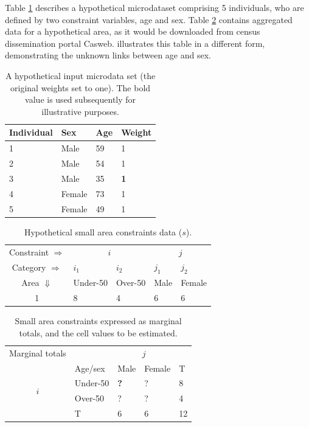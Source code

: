 \documentclass[a4paper,10pt]{article}
\begin{document}
Table \ref{t:w}  describes a
hypothetical microdataset comprising 5 individuals, who are defined by two
constraint variables, age and sex. 
Table \ref{t:s} contains aggregated data
for a hypothetical area, as it would be downloaded from census dissemination
portal Casweb.  illustrates this table in a different form,
demonstrating the unknown links between age and sex.

\begin{table}[h]
\centering
\caption[A hypothetical input microdata set]{A
hypothetical input microdata set (the original
weights set to one). The bold value is used subsequently for
illustrative purposes.}
\begin{tabular}{llll}
\toprule
{Individual } & {Sex} & {Age} & {Weight} \\
\midrule
1 & Male & 59 & 1 \\
2 & Male & 54 & 1 \\
3 & {Male} & {35} & \textbf{1} \\
4 & Female & 73 & 1 \\
5 & Female & 49 & 1 \\
\bottomrule
\end{tabular}
\label{t:w}
\end{table}
\vspace{1cm}


\begin{table}[htbp]
\centering
\caption{Hypothetical small area constraints data ($s$).}
\begin{tabular}{cllll}
\toprule
Constraint $\Rightarrow$ & \multicolumn{2}{c}{$i$}& \multicolumn{2}{c}{$j$}\\
Category $\Rightarrow$ & $i_1$ & $i_2$ & $j_1$ & $j_2$ \\
Area $\Downarrow$  & Under-50 & Over-50 &  Male & Female\\
1  & 8 & 4 & 6 & 6\\
\bottomrule
\end{tabular}
\label{t:s}
\end{table}
\vspace{1cm}

\begin{table}[htbp]
\centering
\caption[Small area constraints expressed as marginal totals]{Small
area constraints expressed as marginal totals, and the cell
values to be estimated.}
\begin{tabular}{cllll}\toprule
Marginal totals&  & \multicolumn{2}{c}{$j$} & \\
& Age/sex & Male & Female & T\\ \midrule
\multirow{2}{*}{$i$} & Under-50 & \textbf{?} & ? & 8\\
& Over-50 & ? & ? &4 \\
& T & 6 & 6 &12\\
\bottomrule
\end{tabular}
\label{t:s2}
\end{table}
\end{document}
